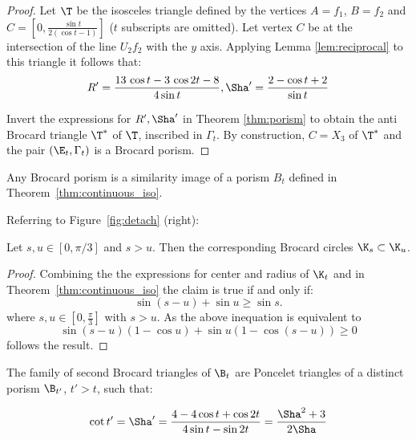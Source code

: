 \begin{proof}
Let $\T$ be the isosceles triangle defined by the vertices $A=f_1$, $B=f_2$ and $C=[0,\frac{\sin t}{2(\cos t  -1)}]$ ($t$ subscripts are omitted). Let vertex $C$ be at the intersection of the line $U_2 f_2$ with the $y$ axis. Applying Lemma \ref{lem:reciprocal} to this triangle it follows that:
\[R'=  \frac {13\,\cos t-3\,\cos 2t -8  }{4 \sin t },\Sha'=\frac {2-\cos t +2}{\sin t} \]

Invert the expressions for $R',\Sha'$ in Theorem \ref{thm:porism} to obtain the anti Brocard triangle $\T^*$ of $\T$, inscribed in $\Gamma_t$. By construction, $C=X_{3}$ of $\T^*$ and the pair $(\E_t,\Gamma_t)$ is a Brocard porism.

\end{proof}


\begin{remark}
Any Brocard porism is a similarity image of a porism $B_t$ defined in Theorem~\ref{thm:continuous_iso}.
\end{remark}

\noindent Referring to Figure~\ref{fig:detach} (right):

\begin{corollary}
Let $s,u\in[0,\pi/3]$ and $s>u$. Then the corresponding Brocard circles $\K_s\subset\K_u$.
\end{corollary}
\begin{proof}
Combining the the expressions for center and radius of $\K_t$ and in Theorem~\ref{thm:continuous_iso} the claim is true if and only if: 
\[\sin(s-u)+\sin u \geq\sin s.\]
\noindent where $s,u\in [0,\frac{\pi}{3}]$ with $s>u$. 
As the above inequation is equivalent to
\[\sin (s-u)(1-\cos u)+\sin u(1-\cos(s-u))\geq 0\] follows the result.
\end{proof}

 \begin{theorem}[Embedding]
 The family of second Brocard triangles of $\B_t$ are Poncelet triangles of a distinct porism $\B_{t'}$, $t'>t$, such that:
 
 \[ \cot{t'}= \Sha' = \frac{4-4\cos{t}+\cos{2t} }{4\sin{t}-\sin{2t}} = \frac{\Sha^2+3}{2\Sha} \]

\label{prop:discrete}
\end{theorem}
 
